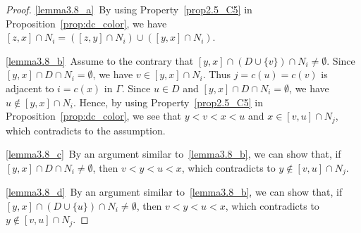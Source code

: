 \documentclass[10pt]{amsart}
\theoremstyle{definition}
\theoremstyle{remark}
\begin{document}
\begin{proof}
\ref{lemma3.8_a}~By using Property~\ref{prop2.5_C5} in Proposition~\ref{prop:dc_color}, 
we have $[z,x] \cap N_i = ( [z,y] \cap N_i ) \cup ( [y,x] \cap N_i)$.

\ref{lemma3.8_b}~Assume to the contrary that $[y,x] \cap (D \cup \{ v \}) \cap N_i \neq \emptyset$.
Since $[y,x] \cap D \cap N_i = \emptyset$, we have $v \in [y,x] \cap N_i$.
Thus $j = c(u) = c(v)$ is adjacent to $i = c(x)$ in $\Gamma$.
Since $u \in D$ and $[y,x] \cap D \cap N_i = \emptyset$, we have $u \not\in [y,x] \cap N_i$.
Hence, by using Property~\ref{prop2.5_C5} in Proposition~\ref{prop:dc_color},
we see that $y < v < x < u$ and $x \in [v,u] \cap N_j$, 
which contradicts to the assumption.

\ref{lemma3.8_c}~By an argument similar to~\ref{lemma3.8_b}, we can show that, if $[y,x] \cap D \cap N_i \neq \emptyset$, 
then $v < y < u < x$, which contradicts to $y \not\in [v,u] \cap N_j$.

\ref{lemma3.8_d}~By an argument similar to~\ref{lemma3.8_b}, we can show that, if $[y,x] \cap (D \cup \{ u \}) \cap N_i \neq \emptyset$, 
then $v < y < u < x$, which contradicts to $y \not\in [v,u] \cap N_j$.
\end{proof}
\end{document}
